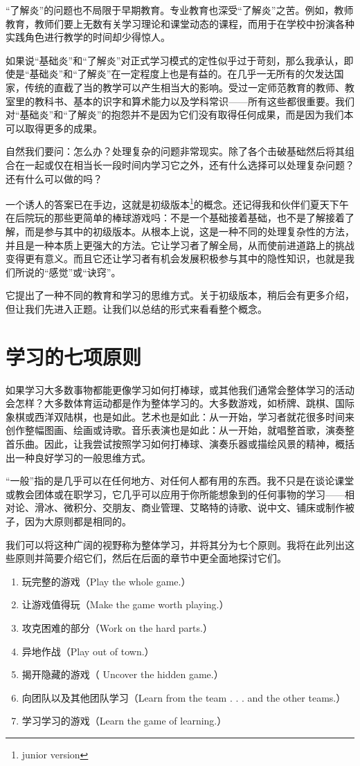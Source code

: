 “了解炎”的问题也不局限于早期教育。专业教育也深受“了解炎”之苦。例如，教师教育，教师们要上无数有关学习理论和课堂动态的课程，而用于在学校中扮演各种实践角色进行教学的时间却少得惊人。

如果说“基础炎”和“了解炎”对正式学习模式的定性似乎过于苛刻，那么我承认，即使是“基础炎”和“了解炎”在一定程度上也是有益的。在几乎一无所有的欠发达国家，传统的直截了当的教学可以产生相当大的影响。受过一定师范教育的教师、教室里的教科书、基本的识字和算术能力以及学科常识——所有这些都很重要。我们对“基础炎”和“了解炎”的抱怨并不是因为它们没有取得任何成果，而是因为我们本可以取得更多的成果。

自然我们要问：怎么办？处理复杂的问题非常现实。除了各个击破基础然后将其组合在一起或仅在相当长一段时间内学习它之外，还有什么选择可以处理复杂问题？还有什么可以做的吗？

一个诱人的答案已在手边，这就是初级版本\footnote{junior version}的概念。还记得我和伙伴们夏天下午在后院玩的那些更简单的棒球游戏吗：不是一个基础接着基础，也不是了解接着了解，而是参与其中的初级版本。从根本上说，这是一种不同的处理复杂性的方法，并且是一种本质上更强大的方法。它让学习者了解全局，从而使前进道路上的挑战变得更有意义。而且它还让学习者有机会发展积极参与其中的隐性知识，也就是我们所说的“感觉”或“诀窍”。

它提出了一种不同的教育和学习的思维方式。关于初级版本，稍后会有更多介绍，但让我们先进入正题。让我们以总结的形式来看看整个概念。

\section*{学习的七项原则}

如果学习大多数事物都能更像学习如何打棒球，或其他我们通常会整体学习的活动会怎样？大多数体育运动都是作为整体学习的。大多数游戏，如桥牌、跳棋、国际象棋或西洋双陆棋，也是如此。艺术也是如此：从一开始，学习者就花很多时间来创作整幅图画、绘画或诗歌。音乐表演也是如此：从一开始，就唱整首歌，演奏整首乐曲。因此，让我尝试按照学习如何打棒球、演奏乐器或描绘风景的精神，概括出一种良好学习的一般思维方式。

“一般”指的是几乎可以在任何地方、对任何人都有用的东西。我不只是在谈论课堂或教会团体或在职学习，它几乎可以应用于你所能想象到的任何事物的学习——相对论、滑冰、微积分、交朋友、商业管理、艾略特的诗歌、说中文、铺床或制作被子，因为大原则都是相同的。

我们可以将这种广阔的视野称为整体学习，并将其分为七个原则。我将在此列出这些原则并简要介绍它们，然后在后面的章节中更全面地探讨它们。
\begin{enumerate}
\item 玩完整的游戏（Play the whole game.）
\item 让游戏值得玩（Make the game worth playing.）
\item 攻克困难的部分（Work on the hard parts.）
\item 异地作战（Play out of town.）
\item 揭开隐藏的游戏（ Uncover the hidden game.）
\item 向团队以及其他团队学习（Learn from the team . . . and the other teams.）
\item 学习学习的游戏（Learn the game of learning.）
\end{enumerate}

